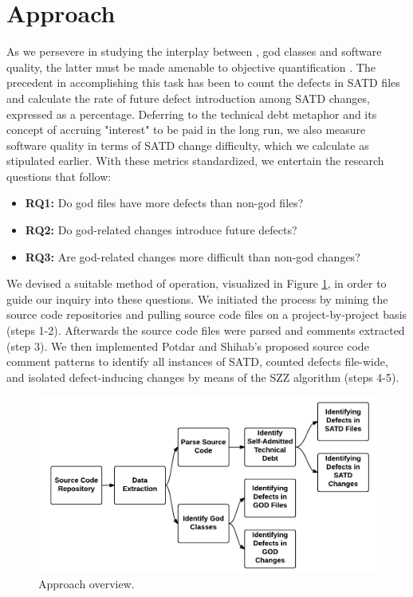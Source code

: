 \section{Approach}
\label{chap4:sec:approach}
As we persevere in studying the interplay between \SATD, god classes and software quality, the latter must be made amenable to objective quantification \cite{Kamei-tse-2013,Kim-tse-2008,sliwerski-msr-2005}. The precedent in accomplishing this task has been to count the defects in SATD files and calculate the rate of future defect introduction among SATD changes, expressed as a percentage. Deferring to the technical debt metaphor and its concept of accruing "interest" to be paid in the long run, we also measure software quality in terms of SATD change difficulty, which we calculate as stipulated earlier. With these metrics standardized, we entertain the research questions that follow:

\begin{itemize}
	\vspace{0.2cm}
	\item {\bf RQ1:} Do god files have more defects than non-god files?\\
	\item {\bf RQ2:} Do god-related changes introduce future defects?\\
	\item {\bf RQ3:} Are god-related changes more difficult than non-god changes?
\end{itemize}

We devised a suitable method of operation, visualized in Figure \ref{fig:CH4_Process_overview}, in order to guide our inquiry into these questions. We initiated the process by mining the source code repositories and pulling source code files on a project-by-project basis (steps 1-2). Afterwards the source code files were parsed and comments extracted (step 3). We then implemented Potdar and Shihab's proposed source code comment patterns to identify all instances of SATD, counted defects file-wide, and isolated defect-inducing changes by means of the SZZ algorithm (steps 4-5).

\begin{figure}[t]
	\centering
	\includegraphics[width=150mm]{figures/chapter4/approach}
	\caption{Approach overview.}
	\label{fig:CH4_Process_overview}
\end{figure}


